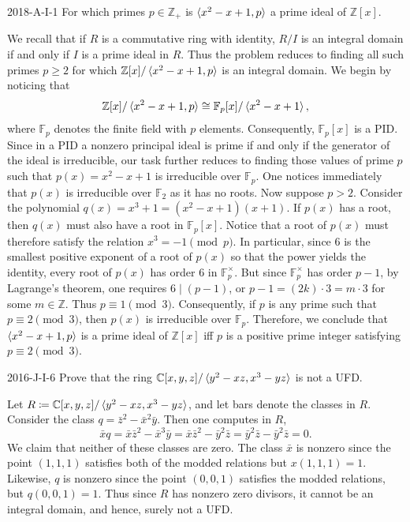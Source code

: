 \documentclass{article}
\begin{document}
	\begin{prb}{2018-A-I-1}
		For which primes $p \in\mathbb{Z}_{+}$ is $\braket{x^{2} -x + 1, p}$ a prime ideal of $\mathbb{Z}[x]$. 
	\end{prb}
	We recall that if $R$ is a commutative ring with identity, $R/I$ is an integral domain if and only if $I$ is a prime ideal in $R$. Thus the problem reduces to finding all such primes $p \geq 2$ for which $\mathbb{Z}[x]/\braket{x^{2} - x + 1, p}$ is an integral domain. We begin by noticing that 
	\begin{equation*}
		\mathbb{Z}[x]/\braket{x^{2} - x + 1, p} \cong \mathbb{F}_{p}[x]/\braket{x^{2} - x + 1}, 
	\end{equation*}
	where $\mathbb{F}_{p}$ denotes the finite field with $p$ elements. Consequently, $\mathbb{F}_{p}[x]$ is a PID. Since in a PID a nonzero principal ideal is prime if and only if the generator of the ideal is irreducible, our task further reduces to finding those values of prime $p$ such that $p(x) = x^{2} - x + 1$ is irreducible over $\mathbb{F}_{p}$. One notices immediately that $p(x)$ is irreducible over $\mathbb{F}_{2}$ as it has no roots. Now suppose $p > 2$. Consider the polynomial $q(x) = x^{3} + 1 = (x^{2} -x + 1)(x + 1)$. If $p(x)$ has a root, then $q(x)$ must also have a root in $\mathbb{F}_{p}[x]$. Notice that a root of $p(x)$ must therefore satisfy the relation $x^{3} = -1 \pmod{p}$. In particular, since $6$ is the smallest positive exponent of a root of $p(x)$ so that the power yields the identity, every root of $p(x)$ has order 6 in $\mathbb{F}_{p}^{\times}$. But since $\mathbb{F}_{p}^{\times}$ has order $p - 1$, by Lagrange's theorem, one requires $6 \mid (p - 1)$, or $p - 1 = (2k) \cdot 3 = m \cdot 3$ for some $m \in \mathbb{Z}$. Thus $p \equiv 1 \pmod{3}$. Consequently, if $p$ is any prime such that $p \equiv 2 \pmod{3}$, then $p(x)$ is irreducible over $\mathbb{F}_{p}$. Therefore, we conclude that $\braket{x^{2} - x + 1, p}$ is a prime ideal of $\mathbb{Z}[x]$ iff $p$ is a positive prime integer satisfying $p \equiv 2 \pmod{3}$. 
	
	\begin{prb}{2016-J-I-6}
		Prove that the ring $\mathbb{C}[x,y,z]/\braket{y^{2} - xz, x^{3} - yz}$ is not a UFD. 
	\end{prb}
	Let $R \coloneqq \mathbb{C}[x,y,z]/\braket{y^{2} - xz, x^{3} - yz}$, and let bars denote the classes in $R$. Consider the class $q = \bar{z}^2 - \bar{x}^2\bar{y}$. Then one computes in $R$, 
	\begin{equation*}
		\bar{x}q = \bar{x}\bar{z}^2 - \bar{x}^3\bar{y} = \bar{x}\bar{z}^{2} - \bar{y}^{2}\bar{z} = \bar{y}^{2}\bar{z} - \bar{y}^{2}\bar{z} = 0. 
	\end{equation*}
	We claim that neither of these classes are zero. The class $\bar{x}$ is nonzero since the point $(1,1,1)$ satisfies both of the modded relations but $x(1,1,1) = 1$. Likewise, $q$ is nonzero since the point $(0,0,1)$ satisfies the modded relations, but $q(0,0,1) = 1$. Thus since $R$ has nonzero zero divisors, it cannot be an integral domain, and hence, surely not a UFD. 
	
\end{document}
